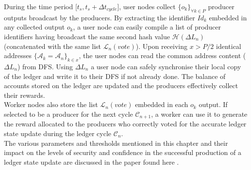 During the time period [$t_{s}, t_s + \Delta t_{cycle}$], user nodes collect $\{o_k\}_{\forall k \in P}$ producer outputs broadcast by the producers.
By extracting the identifier $Id_k$ embedded in any collected output $o_k$, a user node can easily compile a list of producer identifiers having broadcast the same second hash value $\mathcal{H}(\Delta L_n)$ (concatenated with the same list $\mathcal{L}_{n}(vote)$). Upon receiving $x > P/2$ identical addresses $\{\mathcal{A}_k = \mathcal{A}_n\}_{k \in x}$, the user nodes can read the common address content ($\Delta L_n$) from DFS. Using $\Delta L_n$ a user node can safely synchronise their local copy of the ledger and write it to their DFS if not already done. The balance of accounts stored on the ledger are updated and the producers effectively collect their rewards.\\


Worker nodes also store the list $\mathcal{L}_{n}(vote)$ embedded in each $o_k$ output. If selected to be a producer for the next cycle $\mathcal{C}_{n+1}$, a worker can use it to generate the reward allocated to the producers who correctly voted for the accurate ledger state update during the ledger cycle $\mathcal{C}_{n}$.\\


The various parameters and thresholds mentioned in this chapter and their impact on the levels of security and confidence in the successful production of a ledger state update are discussed in the paper found here \cite{catalystresearch2}.